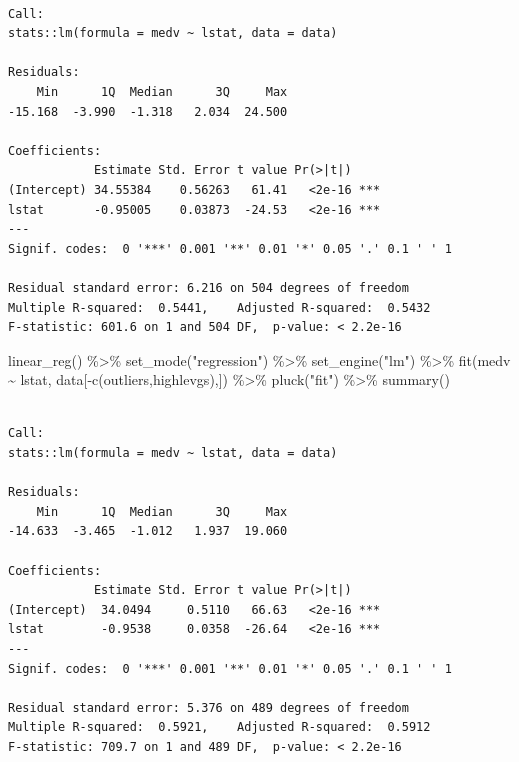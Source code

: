 \documentclass[
  letterpaper,
  DIV=11,
  numbers=noendperiod]{scrreprt}
\newenvironment{Shaded}{\begin{snugshade}}{\end{snugshade}}
\newcommand{\FunctionTok}[1]{\textcolor[rgb]{0.02,0.16,0.49}{#1}}
\newcommand{\NormalTok}[1]{\textcolor[rgb]{0.33,0.33,0.33}{#1}}
\newcommand{\SpecialCharTok}[1]{\textcolor[rgb]{0.00,0.46,0.62}{#1}}
\newcommand{\StringTok}[1]{\textcolor[rgb]{0.00,0.50,0.00}{#1}}
\begin{document}
\begin{verbatim}

Call:
stats::lm(formula = medv ~ lstat, data = data)

Residuals:
    Min      1Q  Median      3Q     Max 
-15.168  -3.990  -1.318   2.034  24.500 

Coefficients:
            Estimate Std. Error t value Pr(>|t|)    
(Intercept) 34.55384    0.56263   61.41   <2e-16 ***
lstat       -0.95005    0.03873  -24.53   <2e-16 ***
---
Signif. codes:  0 '***' 0.001 '**' 0.01 '*' 0.05 '.' 0.1 ' ' 1

Residual standard error: 6.216 on 504 degrees of freedom
Multiple R-squared:  0.5441,    Adjusted R-squared:  0.5432 
F-statistic: 601.6 on 1 and 504 DF,  p-value: < 2.2e-16
\end{verbatim}

\begin{Shaded}
\begin{Highlighting}[]
\FunctionTok{linear\_reg}\NormalTok{() }\SpecialCharTok{\%\textgreater{}\%} 
  \FunctionTok{set\_mode}\NormalTok{(}\StringTok{"regression"}\NormalTok{) }\SpecialCharTok{\%\textgreater{}\%} 
  \FunctionTok{set\_engine}\NormalTok{(}\StringTok{"lm"}\NormalTok{) }\SpecialCharTok{\%\textgreater{}\%} 
  \FunctionTok{fit}\NormalTok{(medv }\SpecialCharTok{\textasciitilde{}}\NormalTok{ lstat, data[}\SpecialCharTok{{-}}\FunctionTok{c}\NormalTok{(outliers,highlevgs),]) }\SpecialCharTok{\%\textgreater{}\%} 
  \FunctionTok{pluck}\NormalTok{(}\StringTok{"fit"}\NormalTok{) }\SpecialCharTok{\%\textgreater{}\%} 
  \FunctionTok{summary}\NormalTok{()}
\end{Highlighting}
\end{Shaded}

\begin{verbatim}

Call:
stats::lm(formula = medv ~ lstat, data = data)

Residuals:
    Min      1Q  Median      3Q     Max 
-14.633  -3.465  -1.012   1.937  19.060 

Coefficients:
            Estimate Std. Error t value Pr(>|t|)    
(Intercept)  34.0494     0.5110   66.63   <2e-16 ***
lstat        -0.9538     0.0358  -26.64   <2e-16 ***
---
Signif. codes:  0 '***' 0.001 '**' 0.01 '*' 0.05 '.' 0.1 ' ' 1

Residual standard error: 5.376 on 489 degrees of freedom
Multiple R-squared:  0.5921,    Adjusted R-squared:  0.5912 
F-statistic: 709.7 on 1 and 489 DF,  p-value: < 2.2e-16
\end{verbatim}
\end{document}
